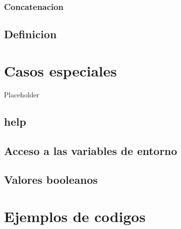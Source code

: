 \documentclass[
]{book}
\begin{document}
\hypertarget{concatenacion}{%
\subsection{Concatenacion}\label{concatenacion}}

\hypertarget{definicion}{%
\section{Definicion}\label{definicion}}

\hypertarget{casos-especiales}{%
\chapter{Casos especiales}\label{casos-especiales}}

Placeholder

\hypertarget{help}{%
\section{help}\label{help}}

\hypertarget{acceso-a-las-variables-de-entorno}{%
\section{Acceso a las variables de entorno}\label{acceso-a-las-variables-de-entorno}}

\hypertarget{valores-booleanos}{%
\section{Valores booleanos}\label{valores-booleanos}}

\hypertarget{ejemplos-de-codigos}{%
\chapter{Ejemplos de codigos}\label{ejemplos-de-codigos}}
\end{document}
